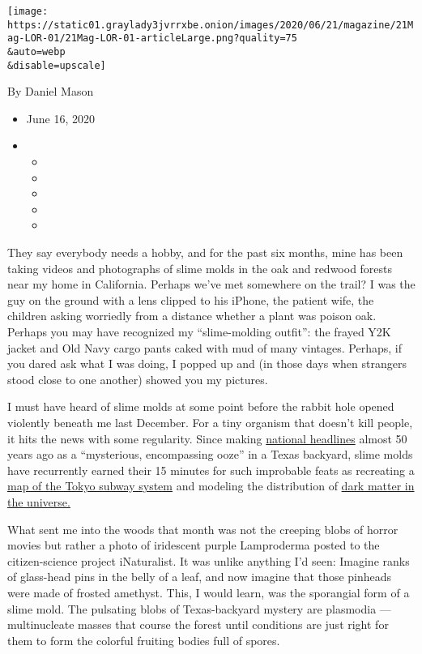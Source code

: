 \texttt{[image: https://static01.graylady3jvrrxbe.onion/images/2020/06/21/magazine/21Mag-LOR-01/21Mag-LOR-01-articleLarge.png?quality=75\\\&auto=webp\\\&disable=upscale]}

By Daniel Mason

\begin{itemize}
\item
  June 16, 2020
\item
  \begin{itemize}
  \item
  \item
  \item
  \item
  \item
  \end{itemize}
\end{itemize}

They say everybody needs a hobby, and for the past six months, mine has
been taking videos and photographs of slime molds in the oak and redwood
forests near my home in California. Perhaps we've met somewhere on the
trail? I was the guy on the ground with a lens clipped to his iPhone,
the patient wife, the children asking worriedly from a distance whether
a plant was poison oak. Perhaps you may have recognized my
``slime-molding outfit'': the frayed Y2K jacket and Old Navy cargo pants
caked with mud of many vintages. Perhaps, if you dared ask what I was
doing, I popped up and (in those days when strangers stood close to one
another) showed you my pictures.

I must have heard of slime molds at some point before the rabbit hole
opened violently beneath me last December. For a tiny organism that
doesn't kill people, it hits the news with some regularity. Since making
\href{https://timesmachine.nytimes3xbfgragh.onion/timesmachine/1973/05/31/99147556.html?pageNumber=82}{national
headlines} almost 50 years ago as a ``mysterious, encompassing ooze'' in
a Texas backyard, slime molds have recurrently earned their 15 minutes
for such improbable feats as recreating a
\href{https://www.livescience.com/8035-slime-mold-beats-humans-perfecting-traffic-networks.html}{map
of the Tokyo subway system} and modeling the distribution of
\href{https://www.nasa.gov/feature/goddard/2020/slime-mold-simulations-used-to-map-dark-matter-holding-universe-together}{dark
matter in the universe.}

What sent me into the woods that month was not the creeping blobs of
horror movies but rather a photo of iridescent purple Lamproderma posted
to the citizen-science project iNaturalist. It was unlike anything I'd
seen: Imagine ranks of glass-head pins in the belly of a leaf, and now
imagine that those pinheads were made of frosted amethyst. This, I would
learn, was the sporangial form of a slime mold. The pulsating blobs of
Texas-backyard mystery are plasmodia --- multinucleate masses that
course the forest until conditions are just right for them to form the
colorful fruiting bodies full of spores.

